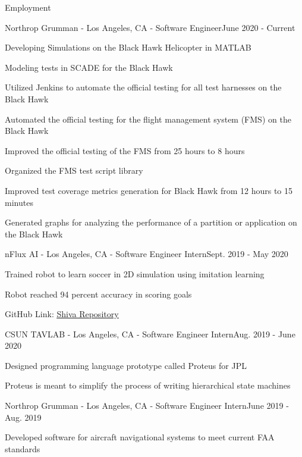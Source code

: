 \documentclass{resume}
\begin{document}
\begin{rSection}{Employment}
    \begin{rSubsection}{Northrop Grumman - Los Angeles, CA - Software Engineer}{June 2020 - Current}{}{}
        \item Developing Simulations on the Black Hawk Helicopter in MATLAB
        \item Modeling tests in SCADE for the Black Hawk
        \item Utilized Jenkins to automate the official testing for all test harnesses on the Black Hawk
        \item Automated the official testing for the flight management system (FMS) on the Black Hawk
        \item Improved the official testing of the FMS from 25 hours to 8 hours
        \item Organized the FMS test script library
        \item Improved test coverage metrics generation for Black Hawk from 12 hours to 15 minutes
        \item Generated graphs for analyzing the performance of a partition or application on the Black Hawk
    \end{rSubsection}
    \begin{rSubsection}{nFlux AI - Los Angeles, CA - Software Engineer Intern}{Sept. 2019 - May 2020}{}{}
        \item Trained robot to learn soccer in 2D simulation using imitation learning
        \item Robot reached 94 percent accuracy in scoring goals
        \item GitHub Link: \href{https://github.com/nflux/Shiva}{\color{blue}\underline{Shiva Repository}}
    \end{rSubsection}
    \begin{rSubsection}{CSUN TAVLAB - Los Angeles, CA - Software Engineer Intern}{Aug. 2019 - June 2020}{}{}
        \item Designed programming language prototype called Proteus for JPL
        \item Proteus is meant to simplify the process of writing hierarchical state machines
    \end{rSubsection}
    \begin{rSubsection}{Northrop Grumman - Los Angeles, CA - Software Engineer Intern}{June 2019 - Aug. 2019}{}{}
        \item Developed software for aircraft navigational systems to meet current FAA standards

\end{rSubsection}
\end{rSection}
\end{document}
